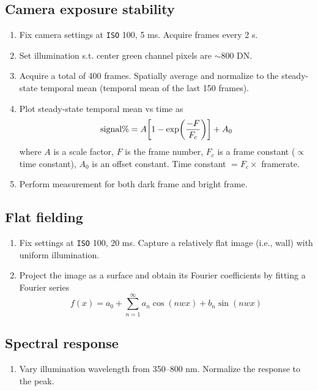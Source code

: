\documentclass[12pt,a4paper]{article}
\begin{document}
\subsection{Camera exposure stability}
\begin{enumerate}
	\item Fix camera settings at \texttt{ISO} 100, 5 ms. Acquire frames every 2 s.
	\item Set illumination s.t. center green channel pixels are $\sim 800$ DN.
	\item Acquire a total of 400 frames. Spatially average and normalize to the steady-state temporal mean (temporal mean of the last 150 frames).
	\item Plot steady-state temporal mean vs time as
		\begin{equation}
			\mathrm{signal}\% = A\qty[1 - \exp(\frac{-F}{F_c})] + A_0
		\end{equation}
		where $A$ is a scale factor, $F$ is the frame number, $F_c$ is a frame constant ($\propto$ time constant), $A_0$ is an offset constant. Time constant $= F_c \times$ framerate.
	\item Perform measurement for both dark frame and bright frame.
\end{enumerate}

\subsection{Flat fielding}
\begin{enumerate}
	\item Fix settings at \texttt{ISO} 100, 20 ms. Capture a relatively flat image (i.e., wall) with uniform illumination.
	\item Project the image as a surface and obtain its Fourier coefficients by fitting a Fourier series
		\begin{equation}
			f(x) = a_0 + \sum_{n=1}^\infty a_n \cos(nwx) + b_n \sin(nwx)
		\end{equation}
\end{enumerate}

\subsection{Spectral response}
\begin{enumerate}
	\item Vary illumination wavelength from 350--800 nm. Normalize the response to the peak.
\end{enumerate}
\end{document}
